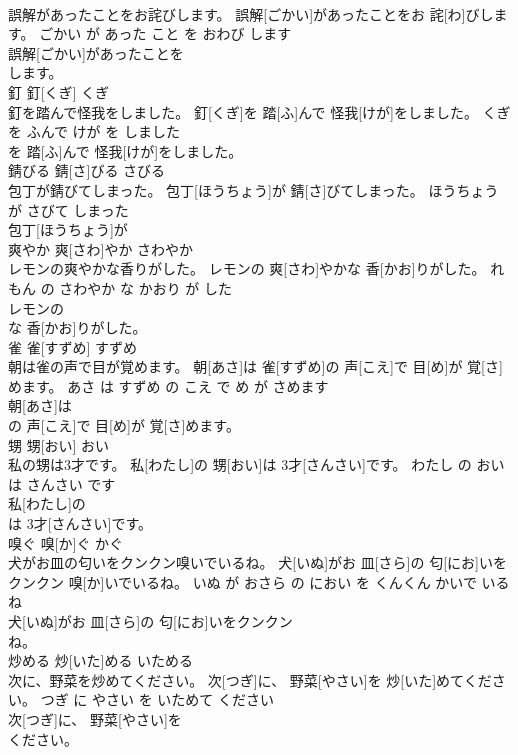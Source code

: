 \documentclass[8pt]{extreport}
\begin{document}
\begin{CJK}{UTF8}{min}
\\	誤解があったことをお詫びします。	誤解[ごかい]があったことをお 詫[わ]びします。	ごかい が あった こと を おわび します	
\\	誤解[ごかい]があったことを
\\	します。			
\\	釘	釘[くぎ]	くぎ	
\\	釘を踏んで怪我をしました。	釘[くぎ]を 踏[ふ]んで 怪我[けが]をしました。	くぎ を ふんで けが を しました	
\\	を 踏[ふ]んで 怪我[けが]をしました。			
\\	錆びる	錆[さ]びる	さびる	
\\	包丁が錆びてしまった。	包丁[ほうちょう]が 錆[さ]びてしまった。	ほうちょう が さびて しまった	
\\	包丁[ほうちょう]が
\\	爽やか	爽[さわ]やか	さわやか	
\\	レモンの爽やかな香りがした。	レモンの 爽[さわ]やかな 香[かお]りがした。	れもん の さわやか な かおり が した	
\\	レモンの
\\	な 香[かお]りがした。			
\\	雀	雀[すずめ]	すずめ	
\\	朝は雀の声で目が覚めます。	朝[あさ]は 雀[すずめ]の 声[こえ]で 目[め]が 覚[さ]めます。	あさ は すずめ の こえ で め が さめます	
\\	朝[あさ]は
\\	の 声[こえ]で 目[め]が 覚[さ]めます。			
\\	甥	甥[おい]	おい	
\\	私の甥は3才です。	私[わたし]の 甥[おい]は 3才[さんさい]です。	わたし の おい は さんさい です	
\\	私[わたし]の
\\	は 3才[さんさい]です。			
\\	嗅ぐ	嗅[か]ぐ	かぐ	
\\	犬がお皿の匂いをクンクン嗅いでいるね。	犬[いぬ]がお 皿[さら]の 匂[にお]いをクンクン 嗅[か]いでいるね。	いぬ が おさら の におい を くんくん かいで いる ね	
\\	犬[いぬ]がお 皿[さら]の 匂[にお]いをクンクン
\\	ね。			
\\	炒める	炒[いた]める	いためる	
\\	次に、野菜を炒めてください。	次[つぎ]に、 野菜[やさい]を 炒[いた]めてください。	つぎ に やさい を いためて ください	
\\	次[つぎ]に、 野菜[やさい]を
\\	ください。			

\end{CJK}
\end{document}
